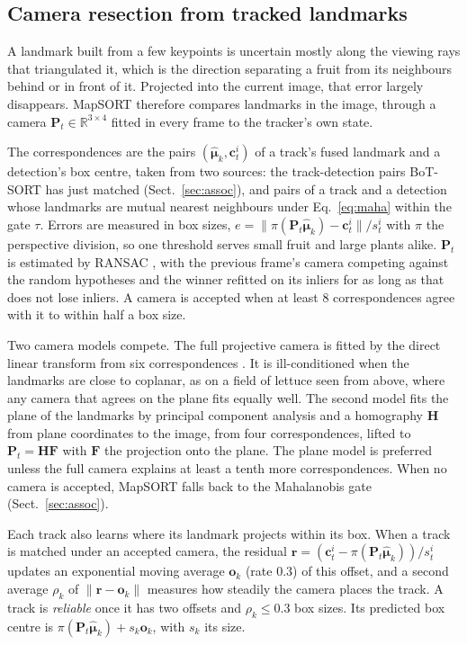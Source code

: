 \documentclass[pdflatex,sn-basic]{sn-jnl}%
\theoremstyle{thmstyleone}%
\newcommand{\bmu}{\bm{\mu}}
\newcommand{\bP}{\bm{P}}
\newcommand{\bH}{\bm{H}}
\newcommand{\bo}{\bm{o}}
\newcommand{\bc}{\bm{c}}
\newcommand{\hmu}{\hat{\bmu}}
\begin{document}
\subsection{Camera resection from tracked landmarks}\label{sec:camera}

A landmark built from a few keypoints is uncertain mostly along the viewing rays that triangulated it, which is the direction separating a fruit from its neighbours behind or in front of it. Projected into the current image, that error largely disappears. MapSORT therefore compares landmarks in the image, through a camera $\bP_t\in\mathbb{R}^{3\times4}$ fitted in every frame to the tracker's own state.

The correspondences are the pairs $(\hmu_k,\bc_t^i)$ of a track's fused landmark and a detection's box centre, taken from two sources: the track-detection pairs BoT-SORT has just matched (Sect.~\ref{sec:assoc}), and pairs of a track and a detection whose landmarks are mutual nearest neighbours under Eq.~\eqref{eq:maha} within the gate $\tau$. Errors are measured in box sizes, $e=\lVert\pi(\bP_t\hmu_k)-\bc_t^i\rVert/s_t^i$ with $\pi$ the perspective division, so one threshold serves small fruit and large plants alike. $\bP_t$ is estimated by RANSAC \citep{fischler1981ransac}, with the previous frame's camera competing against the random hypotheses and the winner refitted on its inliers for as long as that does not lose inliers. A camera is accepted when at least 8 correspondences agree with it to within half a box size.

Two camera models compete. The full projective camera is fitted by the direct linear transform from six correspondences \citep{hartley2004multiple}. It is ill-conditioned when the landmarks are close to coplanar, as on a field of lettuce seen from above, where any camera that agrees on the plane fits equally well. The second model fits the plane of the landmarks by principal component analysis and a homography $\bH$ from plane coordinates to the image, from four correspondences, lifted to $\bP_t=\bH\bm{F}$ with $\bm{F}$ the projection onto the plane. The plane model is preferred unless the full camera explains at least a tenth more correspondences. When no camera is accepted, MapSORT falls back to the Mahalanobis gate (Sect.~\ref{sec:assoc}).

Each track also learns where its landmark projects within its box. When a track is matched under an accepted camera, the residual $\bm{r}=(\bc_t^i-\pi(\bP_t\hmu_k))/s_t^i$ updates an exponential moving average $\bo_k$ (rate 0.3) of this offset, and a second average $\rho_k$ of $\lVert\bm{r}-\bo_k\rVert$ measures how steadily the camera places the track. A track is \emph{reliable} once it has two offsets and $\rho_k\le0.3$ box sizes. Its predicted box centre is $\pi(\bP_t\hmu_k)+s_k\bo_k$, with $s_k$ its size.
\end{document}
